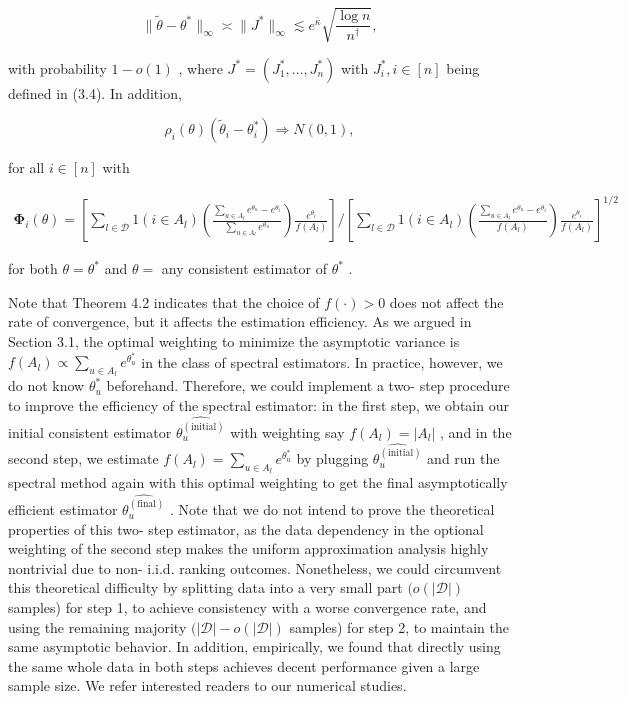 \[
\| \widetilde{\theta} -\theta^{*}\|_{\infty}\asymp \| J^{*}\|_{\infty}\lesssim e^{\bar{\kappa}}\sqrt{\frac{\log n}{n^{\dagger}}}, \tag{4.3}
\]

with probability \(1 - o(1)\) , where
\(J^{*} = (J_{1}^{*},\dots ,J_{n}^{*})\) with \(J_{i}^{*},i\in [n]\)
being defined in (3.4). In addition,

\[
\rho_{i}(\theta)(\widetilde{\theta}_{i} - \theta_{i}^{*})\Rightarrow N(0,1),
\]

for all \(i\in [n]\) with

\[
\begin{array}{r}{\mathbf{\Phi}_{i}(\theta) = \left[\sum_{l\in \mathcal{D}}1(i\in A_{l})\left(\frac{\sum_{u\in A_{l}}e^{\theta_{u}} - e^{\theta_{i}}}{\sum_{u\in A_{l}}e^{\theta_{u}}}\right)\frac{e^{\theta_{i}}}{f(A_{l})}\right] / \left[\sum_{l\in \mathcal{D}}1(i\in A_{l})\left(\frac{\sum_{u\in A_{l}}e^{\theta_{u}} - e^{\theta_{i}}}{f(A_{l})}\right)\frac{e^{\theta_{i}}}{f(A_{l})}\right]^{1 / 2}} \end{array}
\]

for both \(\theta = \theta^{*}\) and \(\theta =\) any consistent
estimator of \(\theta^{*}\) .

Note that Theorem 4.2 indicates that the choice of \(f(\cdot) > 0\) does
not affect the rate of convergence, but it affects the estimation
efficiency. As we argued in Section 3.1, the optimal weighting to
minimize the asymptotic variance is
\(f(A_{l})\propto \sum_{u\in A_{l}}e^{\theta_{u}^{*}}\) in the class of
spectral estimators. In practice, however, we do not know
\(\theta_{u}^{*}\) beforehand. Therefore, we could implement a two- step
procedure to improve the efficiency of the spectral estimator: in the
first step, we obtain our initial consistent estimator
\(\widehat{\theta_{u}^{(\mathrm{initial})}}\) with weighting say
\(f(A_{l}) = |A_{l}|\) , and in the second step, we estimate
\(f(A_{l}) = \sum_{u\in A_{l}}e^{\theta_{u}^{*}}\) by plugging
\(\widehat{\theta_{u}^{(\mathrm{initial})}}\) and run the spectral
method again with this optimal weighting to get the final asymptotically
efficient estimator \(\widehat{\theta_{u}^{(\mathrm{final})}}\) . Note
that we do not intend to prove the theoretical properties of this two-
step estimator, as the data dependency in the optional weighting of the
second step makes the uniform approximation analysis highly nontrivial
due to non- i.i.d. ranking outcomes. Nonetheless, we could circumvent
this theoretical difficulty by splitting data into a very small part
\((o(|\mathcal{D}|)\) samples) for step 1, to achieve consistency with a
worse convergence rate, and using the remaining majority
\((|\mathcal{D}| - o(|\mathcal{D}|)\) samples) for step 2, to maintain
the same asymptotic behavior. In addition, empirically, we found that
directly using the same whole data in both steps achieves decent
performance given a large sample size. We refer interested readers to
our numerical studies.

